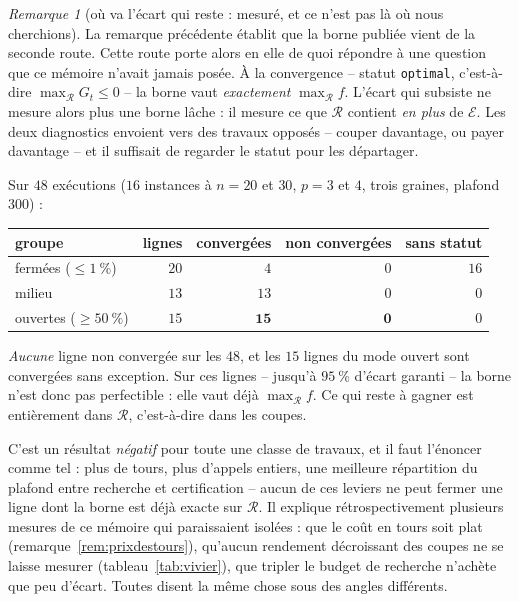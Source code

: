 \documentclass[11pt,a4paper]{article}
\theoremstyle{plain}
\theoremstyle{remark}
\newtheorem{remark}{Remarque}
\newcommand{\Ecal}{\mathcal{E}}
\newcommand{\Rcal}{\mathcal{R}}
\begin{document}
\begin{remark}[où va l'écart qui reste : mesuré, et ce n'est pas là où nous
cherchions]
\label{rem:bimodalitemesuree}
La remarque précédente établit que la borne publiée vient de la seconde
route. Cette route porte alors en elle de quoi répondre à une question que
ce mémoire n'avait jamais posée. À la convergence -- statut
\texttt{optimal}, c'est-à-dire $\max_{\Rcal}G_t\le 0$ -- la borne vaut
\emph{exactement} $\max_{\Rcal}f$. L'écart qui subsiste ne mesure alors plus
une borne lâche : il mesure ce que $\Rcal$ contient \emph{en plus} de
$\Ecal$. Les deux diagnostics envoient vers des travaux opposés -- couper
davantage, ou payer davantage -- et il suffisait de regarder le statut pour
les départager.

Sur $48$ exécutions ($16$ instances à $n=20$ et $30$, $p=3$ et $4$, trois
graines, plafond $300$) :

\begin{center}\small
\begin{tabular}{lrrrr}
\toprule
groupe & lignes & convergées & non convergées & sans statut\\
\midrule
fermées ($\le 1\ \%$) & $20$ & $4$ & $0$ & $16$\\
milieu & $13$ & $13$ & $0$ & $0$\\
ouvertes ($\ge 50\ \%$) & $15$ & $\mathbf{15}$ & $\mathbf{0}$ & $0$\\
\bottomrule
\end{tabular}
\end{center}

\noindent
\emph{Aucune} ligne non convergée sur les $48$, et les $15$ lignes du mode
ouvert sont convergées sans exception. Sur ces lignes -- jusqu'à
$95\ \%$ d'écart garanti -- la borne n'est donc pas perfectible : elle vaut
déjà $\max_{\Rcal}f$. Ce qui reste à gagner est entièrement dans $\Rcal$,
c'est-à-dire dans les coupes.

C'est un résultat \emph{négatif} pour toute une classe de travaux, et il
faut l'énoncer comme tel : plus de tours, plus d'appels entiers, une
meilleure répartition du plafond entre recherche et certification -- aucun
de ces leviers ne peut fermer une ligne dont la borne est déjà exacte sur
$\Rcal$. Il explique rétrospectivement plusieurs mesures de ce mémoire qui
paraissaient isolées : que le coût en tours soit plat
(remarque~\ref{rem:prixdestours}), qu'aucun rendement décroissant des
coupes ne se laisse mesurer (tableau~\ref{tab:vivier}), que tripler le
budget de recherche n'achète que peu d'écart. Toutes disent la même chose
sous des angles différents.


\end{remark}
\end{document}
